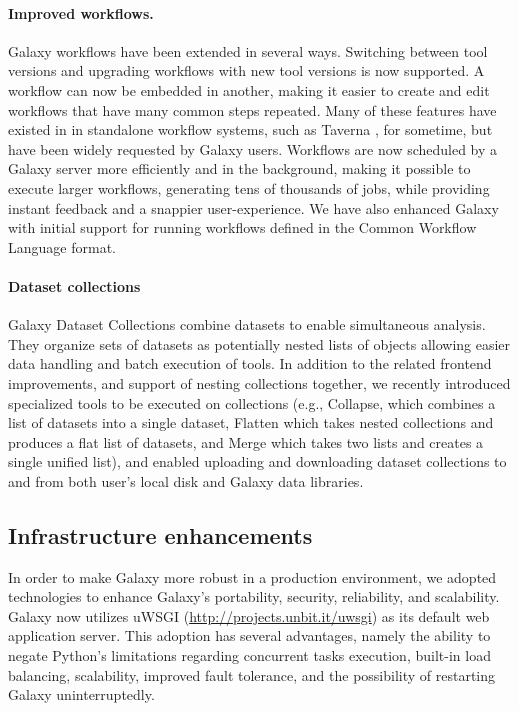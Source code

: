 \paragraph*{Improved workflows.}
Galaxy workflows have been extended in several ways. Switching between tool versions and upgrading workflows with new tool versions is now supported. A workflow can now be embedded in another, making it easier to create and edit workflows that have many common steps repeated. Many of these features have existed in in standalone workflow systems, such as Taverna \cite{wolstencroft2013taverna}, for sometime, but have been widely requested by Galaxy users. Workflows are now scheduled by a Galaxy server more efficiently and in the background, making it possible to execute larger workflows, generating tens of thousands of jobs, while providing instant feedback and a snappier user-experience. We have also enhanced Galaxy with initial support for running workflows defined in the Common Workflow Language \cite{amstutz2016common} format.

\paragraph*{Dataset collections}
Galaxy Dataset Collections combine datasets to enable simultaneous analysis. They organize sets of datasets as potentially nested lists of objects allowing easier data handling and batch execution of tools. In addition to the related frontend improvements, and support of nesting collections together, we recently introduced specialized tools to be executed on collections (e.g., Collapse, which combines a list of datasets into a single dataset, Flatten which takes nested collections and produces a flat list of datasets, and Merge which takes two lists and creates a single unified list), and enabled uploading and downloading dataset collections to and from both user’s local disk and Galaxy data libraries.

\subsection*{Infrastructure enhancements}
In order to make Galaxy more robust in a production environment, we adopted technologies to enhance Galaxy’s portability, security, reliability, and scalability. Galaxy now utilizes uWSGI (\url{http://projects.unbit.it/uwsgi}) as its default web application server. This adoption has several advantages, namely the ability to negate Python’s limitations regarding concurrent tasks execution, built-in load balancing, scalability, improved fault tolerance, and the possibility of restarting Galaxy uninterruptedly.

